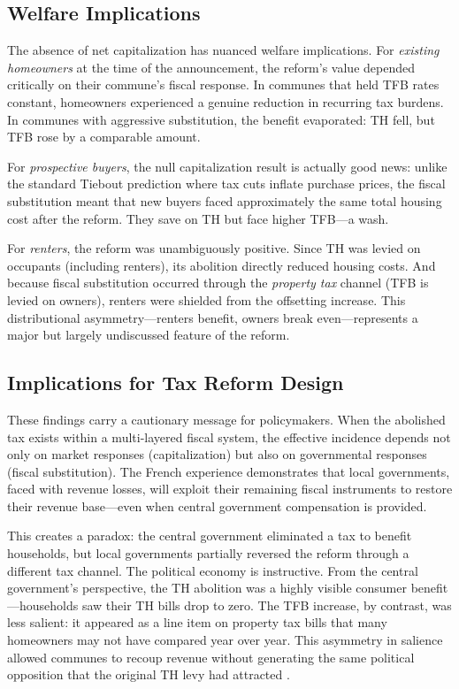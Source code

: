 \documentclass[12pt]{article}
\begin{document}
\subsection{Welfare Implications}

The absence of net capitalization has nuanced welfare implications. For \emph{existing homeowners} at the time of the announcement, the reform's value depended critically on their commune's fiscal response. In communes that held TFB rates constant, homeowners experienced a genuine reduction in recurring tax burdens. In communes with aggressive substitution, the benefit evaporated: TH fell, but TFB rose by a comparable amount.

For \emph{prospective buyers}, the null capitalization result is actually good news: unlike the standard Tiebout prediction where tax cuts inflate purchase prices, the fiscal substitution meant that new buyers faced approximately the same total housing cost after the reform. They save on TH but face higher TFB---a wash.

For \emph{renters}, the reform was unambiguously positive. Since TH was levied on occupants (including renters), its abolition directly reduced housing costs. And because fiscal substitution occurred through the \emph{property tax} channel (TFB is levied on owners), renters were shielded from the offsetting increase. This distributional asymmetry---renters benefit, owners break even---represents a major but largely undiscussed feature of the reform.

\subsection{Implications for Tax Reform Design}

These findings carry a cautionary message for policymakers. When the abolished tax exists within a multi-layered fiscal system, the effective incidence depends not only on market responses (capitalization) but also on governmental responses (fiscal substitution). The French experience demonstrates that local governments, faced with revenue losses, will exploit their remaining fiscal instruments to restore their revenue base---even when central government compensation is provided.

This creates a paradox: the central government eliminated a tax to benefit households, but local governments partially reversed the reform through a different tax channel. The political economy is instructive. From the central government's perspective, the TH abolition was a highly visible consumer benefit---households saw their TH bills drop to zero. The TFB increase, by contrast, was less salient: it appeared as a line item on property tax bills that many homeowners may not have compared year over year. This asymmetry in salience allowed communes to recoup revenue without generating the same political opposition that the original TH levy had attracted \citep{chetty2009}.
\end{document}
